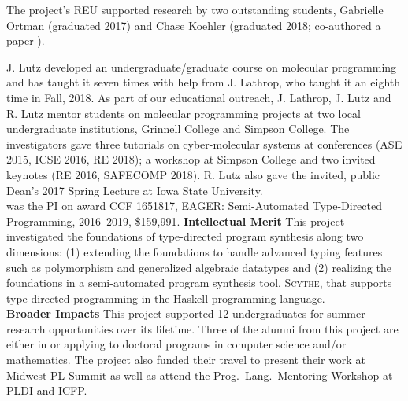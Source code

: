 The project's REU supported research by two outstanding students, Gabrielle Ortman (graduated 2017)  and Chase Koehler (graduated 2018; co-authored a paper \cite{cKMHL18}).

J. Lutz developed  an undergraduate/graduate course on molecular programming and has taught it seven times with help from J. Lathrop, who taught it an eighth time in Fall, 2018.  As part of our educational outreach, J. Lathrop, J. Lutz and R. Lutz mentor students on molecular programming projects at two local undergraduate institutions, Grinnell College and Simpson College.
The investigators gave three tutorials on cyber-molecular systems at conferences (ASE 2015, ICSE 2016, RE 2018); a workshop at Simpson College and two invited keynotes (RE 2016, SAFECOMP 2018).
R. Lutz also gave the invited, public Dean's 2017 Spring Lecture at Iowa State University. \\

 was the PI on award CCF 1651817, EAGER: Semi-Automated Type-Directed Programming, 2016--2019, \$159,991.
{\bf Intellectual Merit}
This project investigated the foundations of type-directed program synthesis along two dimensions: (1) extending the foundations to handle advanced typing features such as polymorphism and generalized algebraic datatypes and (2) realizing the foundations in a semi-automated program synthesis tool, \textsc{Scythe}, that supports type-directed programming in the Haskell programming language. \\
{\bf Broader Impacts}
This project supported 12 undergraduates for summer research opportunities over its lifetime.
Three of the alumni from this project are either in or applying to doctoral programs in computer science and/or mathematics.
The project also funded their travel to present their work at Midwest PL Summit as well as attend the Prog.~Lang.~Mentoring Workshop at PLDI and ICFP.
